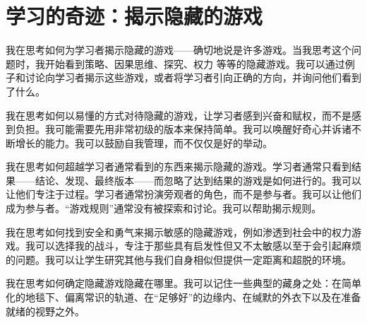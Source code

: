 \section*{学习的奇迹：揭示隐藏的游戏}

我在思考如何为学习者揭示隐藏的游戏——确切地说是许多游戏。当我思考这个问题时，我开始看到策略、因果思维、探究、权力
等等的隐藏游戏。我可以通过例子和讨论向学习者揭示这些游戏，或者将学习者引向正确的方向，并询问他们看到了什么。

我在思考如何以易懂的方式对待隐藏的游戏，让学习者感到兴奋和赋权，而不是感到负担。我可能需要先用非常初级的版本来保持简单。我可以唤醒好奇心并诉诸不断增长的能力。我可以鼓励自我管理，而不仅仅是好的举动。

我在思考如何超越学习者通常看到的东西来揭示隐藏的游戏。学习者通常只看到结果——结论、发现、最终版本——而忽略了达到结果的游戏是如何进行的。我可以让他们专注于过程。学习者通常扮演旁观者的角色，而不是参与者。我可以让他们成为参与者。“游戏规则”通常没有被探索和讨论。我可以帮助揭示规则。

我在思考如何找到安全和勇气来揭示敏感的隐藏游戏，例如渗透到社会中的权力游戏。我可以选择我的战斗，专注于那些具有启发性但又不太敏感以至于会引起麻烦的问题。我可以让学生研究其他与我们自身相似但提供一定距离和超脱的环境。

我在思考如何确定隐藏游戏隐藏在哪里。我可以记住一些典型的藏身之处：在简单化的地毯下、偏离常识的轨道、在“足够好”的边缘内、在缄默的外衣下以及在准备就绪的视野之外。


